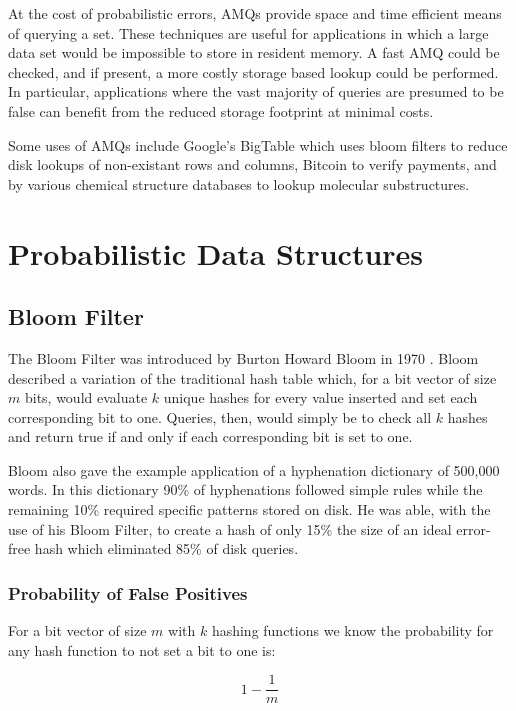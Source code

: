 \documentclass[twoside]{article}
\begin{document}
At the cost of probabilistic errors, AMQs provide space and time efficient means of querying a set. These techniques are useful for applications in which a large data set would be impossible to store in resident memory. A fast AMQ could be checked, and if present, a more costly storage based lookup could be performed. In particular, applications where the vast majority of queries are presumed to be false can benefit from the reduced storage footprint at minimal costs.

Some uses of AMQs include Google's BigTable which uses bloom filters to reduce disk lookups of non-existant rows and columns\cite{google}, Bitcoin to verify payments\cite{bitcoin}, and by various chemical structure databases to lookup molecular substructures\cite{chemicals}.

\section{Probabilistic Data Structures}

\subsection{Bloom Filter}

The Bloom Filter was introduced by Burton Howard Bloom in 1970 \cite{bloom}. Bloom described a variation of the traditional hash table which, for a bit vector of size $m$ bits, would evaluate $k$ unique hashes for every value inserted and set each corresponding bit to one. Queries, then, would simply be to check all $k$ hashes and return true if and only if each corresponding bit is set to one.

Bloom also gave the example application of a hyphenation dictionary of 500,000 words. In this dictionary 90\% of hyphenations followed simple rules while the remaining 10\% required specific patterns stored on disk. He was able, with the use of his Bloom Filter, to create a hash of only 15\% the size of an ideal error-free hash which eliminated 85\% of disk queries.

\subsubsection{Probability of False Positives}

For a bit vector of size $m$ with $k$ hashing functions we know the probability for any hash function to not set a bit to one is:

\begin{equation}
1 - \frac{1}{m}
\end{equation}
\end{document}
